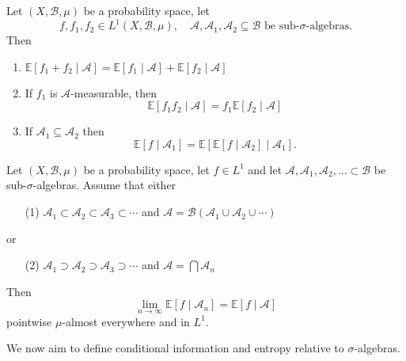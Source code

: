 \documentclass{article}
\begin{document}
\begin{thm}
  Let $(X,\mathcal{B},\mu)$ be a probability space, let
  \begin{equation*}
    f,f_1,f_2 \in L^1(X, \mathcal{B},\mu), \quad \mathcal{A}, \mathcal{A}_1, \mathcal{A}_2 \subseteq \mathcal{B} \text{ be sub-$\sigma$-algebras.}
  \end{equation*}
  Then
  \begin{enumerate}[label=(\arabic*)]
    \item $\mathbb{E}[f_1+f_2 \mid \mathcal{A}] = \mathbb{E}[f_1 \mid \mathcal{A}] + \mathbb{E}[f_2 \mid \mathcal{A}]$
    \item If $f_1$ is $\mathcal{A}$-measurable, then
      \begin{equation*}
        \mathbb{E}[f_1 f_2 \mid \mathcal{A}] = f_1 \mathbb{E}[f_2 \mid \mathcal{A}]
      \end{equation*}
    \item If $\mathcal{A}_1 \subseteq \mathcal{A}_2$ then
      \begin{equation*}
        \mathbb{E}[f \mid \mathcal{A}_1] = \mathbb{E}[ \mathbb{E} [f \mid \mathcal{A}_2] \mid \mathcal{A}_1].
      \end{equation*}
  \end{enumerate}
\end{thm}
\begin{thm}
  Let $(X, \mathcal{B},\mu)$ be a probability space, let $f \in L^1$ and let $\mathcal{A}, \mathcal{A}_1, \mathcal{A}_2, \dotsc \subset \mathcal{B}$ be sub-$\sigma$-algebras.
  Assume that either
  \begin{itemize}
    \item[(1)] $\mathcal{A}_1 \subset \mathcal{A}_2 \subset \mathcal{A}_3 \subset \dotsb$ and $\mathcal{A} = \mathcal{B}(\mathcal{A}_1 \cup \mathcal{A}_2 \cup \dotsb)$
  \end{itemize}
  or
  \begin{itemize}
    \item[(2)] $\mathcal{A}_1 \supset \mathcal{A}_2 \supset \mathcal{A}_3 \supset \dotsb$ and $\mathcal{A} = \bigcap \mathcal{A}_n$
  \end{itemize}
  Then
  \begin{equation*}
    \lim_{n\to \infty} \mathbb{E}[f \mid \mathcal{A}_n] = \mathbb{E}[f \mid \mathcal{A}]
  \end{equation*}
  pointwise $\mu$-almost everywhere and in $L^1$.
\end{thm}
We now aim to define conditional information and entropy relative to $\sigma$-algebras.
\end{document}
